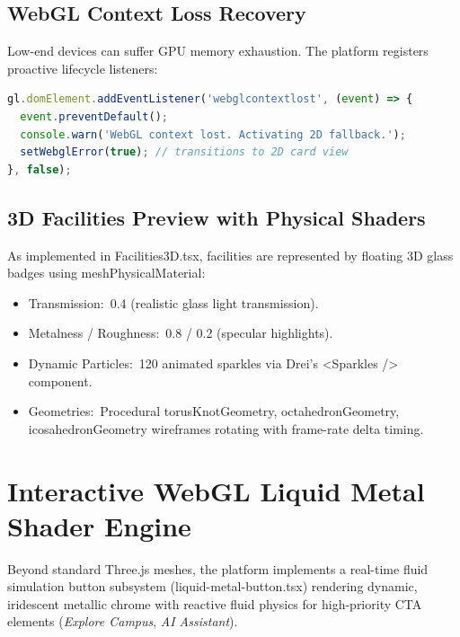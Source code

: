 \documentclass[12pt, a4paper, oneside]{report}
\def\textbf#1{#1}
\def\texttt#1{#1}
\begin{document}
\subsection{WebGL Context Loss Recovery}

Low-end devices can suffer GPU memory exhaustion.  The platform registers
proactive lifecycle listeners:

\begin{lstlisting}[language=JavaScript,
  caption={Graceful WebGL Context Loss in \texttt{Facilities3D.tsx}}]
gl.domElement.addEventListener('webglcontextlost', (event) => {
  event.preventDefault();
  console.warn('WebGL context lost. Activating 2D fallback.');
  setWebglError(true); // transitions to 2D card view
}, false);
\end{lstlisting}

\subsection{3D Facilities Preview with Physical Shaders}

As implemented in \texttt{Facilities3D.tsx}, facilities are represented by
floating 3D glass badges using \texttt{meshPhysicalMaterial}:
\begin{itemize}
  \item \textbf{Transmission:}\ 0.4 (realistic glass light transmission).
  \item \textbf{Metalness / Roughness:}\ 0.8 / 0.2 (specular highlights).
  \item \textbf{Dynamic Particles:}\ 120 animated sparkles via Drei's
        \texttt{<Sparkles />} component.
  \item \textbf{Geometries:}\ Procedural \texttt{torusKnotGeometry},
        \texttt{octahedronGeometry}, \texttt{icosahedronGeometry} wireframes
        rotating with frame-rate delta timing.
\end{itemize}

\section{Interactive WebGL Liquid Metal Shader Engine}

Beyond standard Three.js meshes, the platform implements a real-time fluid
simulation button subsystem (\texttt{liquid-metal-button.tsx}) rendering
dynamic, iridescent metallic chrome with reactive fluid physics for
high-priority CTA elements (\textit{Explore Campus}, \textit{AI Assistant}).
\end{document}
